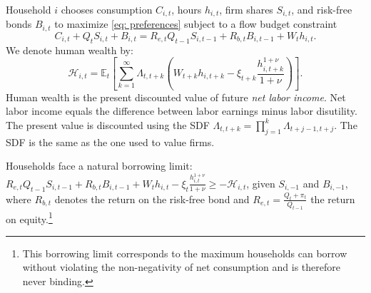 Household $i$ chooses consumption $C_{i,t}$, hours $h_{i,t}$, firm shares $S_{i,t}$, and risk-free bonds $B_{i,t}$ to maximize \eqref{eq: preferences} subject to a flow budget constraint
\begin{equation}\label{eq: flow_bc}
    C_{i,t} + Q_t S_{i,t} + B_{i,t} = R_{e,t} Q_{t-1} S_{i,t-1} + R_{b,t} B_{i,t-1} + W_t h_{i,t}.
\end{equation}
We denote human wealth by:
\begin{equation}\label{eq: human_wealth}
   \mathcal{H}_{i,t} = \mathbb{E}_t\left[ \sum_{k=1}^\infty \Lambda_{t,t+k} \left( W_{t+k} h_{i,t+k}- \xi_{t+k} \frac{h_{i,t+k}^{1+\nu}}{1+\nu}  \right) \right].
\end{equation}
Human wealth is the present discounted value of future \textit{net labor income}. Net labor income equals the difference between labor earnings minus labor disutility. The present value is discounted using the SDF $\Lambda_{t,t+k} = \prod_{j=1}^k \Lambda_{t+j-1,t+j}$. The SDF is the same as the one used to value firms. 

Households face a natural borrowing limit: $R_{e,t}Q_{t-1} S_{i,t-1} + R_{b,t} B_{i,t-1} + W_t h_{i,t}- \xi_t \frac{h_{i,t}^{1+\nu}}{1+\nu} \geq -\mathcal{H}_{i,t}$, given $S_{i,-1}$ and $B_{i,-1}$, where $R_{b,t}$ denotes the return on the risk-free bond and $R_{e,t} = \frac{Q_t + \pi_t}{Q_{t-1}}$ the return on equity.\footnote{This borrowing limit corresponds to the maximum households can borrow without violating the non-negativity of net consumption and is therefore never binding.}


